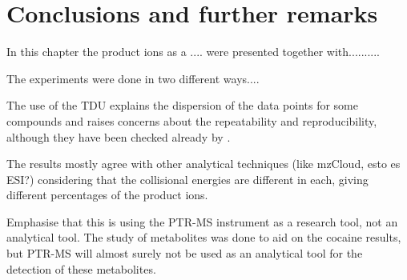 \section{Conclusions and further remarks}













































In this chapter the product ions as a ....
were presented together with..........

The experiments were done in two different ways....

The use of the TDU explains the dispersion of the data points for some compounds and raises concerns about the repeatability  and reproducibility, although they have been checked already by \citeauthor{RN445} \cite{RN445}.


The results mostly agree with other analytical techniques (like mzCloud, esto es ESI?) considering that the collisional energies are different in each, giving different percentages of the product ions.

Emphasise that this is using the PTR-MS instrument as a research tool, not an analytical tool.
The study of metabolites was done to aid on the cocaine results, but PTR-MS will almost surely not be used as an analytical tool for the detection of these metabolites.








